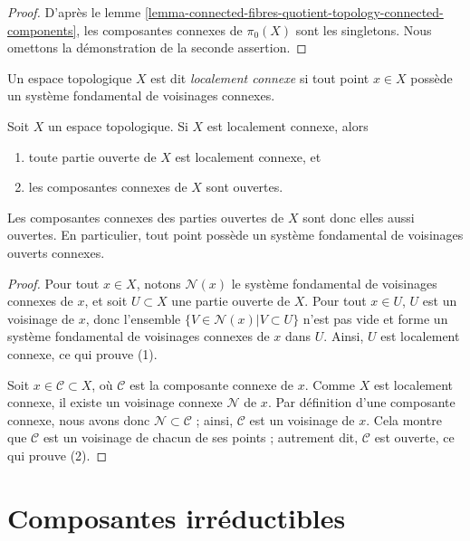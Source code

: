 \begin{proof}
D'après le lemme
\ref{lemma-connected-fibres-quotient-topology-connected-components},
les composantes connexes de $\pi_0(X)$ sont les singletons.
Nous omettons la démonstration de la seconde assertion.
\end{proof}

\begin{definition}
\label{definition-locally-connected}
Un espace topologique $X$ est dit {\it localement connexe} si tout point
$x \in X$ possède un système fondamental de voisinages connexes.
\end{definition}

\begin{lemma}
\label{lemma-locally-connected}
Soit $X$ un espace topologique. Si $X$ est localement connexe, alors
\begin{enumerate}
\item toute partie ouverte de $X$ est localement connexe, et
\item les composantes connexes de $X$ sont ouvertes.
\end{enumerate}
Les composantes connexes des parties ouvertes de $X$ sont donc elles aussi
ouvertes. En particulier, tout point possède un système fondamental de
voisinages ouverts connexes.
\end{lemma}

\begin{proof}
Pour tout $x\in X$, notons $\mathcal{N}(x)$ le système fondamental de
voisinages connexes de $x$, et soit $U\subset X$ une partie ouverte de $X$.
Pour tout $x\in U$, $U$ est un voisinage de $x$, donc l'ensemble
$\{V \in \mathcal{N}(x) | V\subset U\}$ n'est pas vide et forme un système
fondamental de voisinages connexes de $x$ dans $U$. Ainsi, $U$ est localement
connexe, ce qui prouve (1).

\medskip\noindent
Soit $x \in \mathcal{C} \subset X$, où $\mathcal{C}$ est la composante
connexe de $x$. Comme $X$ est localement connexe, il existe un voisinage
connexe $\mathcal{N}$ de $x$. Par définition d'une composante connexe, nous
avons donc $\mathcal{N} \subset \mathcal{C}$ ; ainsi, $\mathcal{C}$ est un
voisinage de $x$. Cela montre que $\mathcal{C}$ est un voisinage de chacun de
ses points ; autrement dit, $\mathcal{C}$ est ouverte, ce qui prouve (2).
\end{proof}




\section{Composantes irréductibles}
\label{section-irreducible-components}

